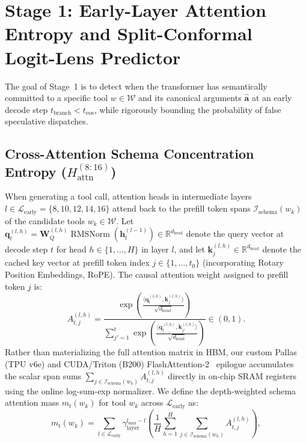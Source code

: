 \documentclass[10pt,conference]{IEEEtran}
\begin{document}
\section{Stage 1: Early-Layer Attention Entropy and Split-Conformal Logit-Lens Predictor}
\label{sec:stage1}

The goal of Stage~1 is to detect when the transformer has semantically committed to a specific tool $w \in \mathcal{W}$ and its canonical arguments $\hat{\mathbf{a}}$ at an early decode step $t_{\text{branch}} < t_{\text{eos}}$, while rigorously bounding the probability of false speculative dispatches.

\subsection{Cross-Attention Schema Concentration Entropy ($H_{\text{attn}}^{(8:16)}$)}
When generating a tool call, attention heads in intermediate layers $l \in \mathcal{L}_{\text{early}} = \{8, 10, 12, 14, 16\}$ attend back to the prefill token spans $\mathcal{I}_{\text{schema}}(w_k)$ of the candidate tools $w_k \in \mathcal{W}$. Let $\mathbf{q}_t^{(l, h)} = \mathbf{W}_Q^{(l, h)} \operatorname{RMSNorm}(\mathbf{h}_t^{(l-1)}) \in \mathbb{R}^{d_{\text{head}}}$ denote the query vector at decode step $t$ for head $h \in \{1, \dots, H\}$ in layer $l$, and let $\mathbf{k}_j^{(l, h)} \in \mathbb{R}^{d_{\text{head}}}$ denote the cached key vector at prefill token index $j \in \{1, \dots, t_0\}$ (incorporating Rotary Position Embeddings, RoPE). The causal attention weight assigned to prefill token $j$ is:
\begin{equation}
A_{t, j}^{(l, h)} = \frac{\exp\!\left(\frac{\langle \mathbf{q}_t^{(l, h)}, \mathbf{k}_j^{(l, h)} \rangle}{\sqrt{d_{\text{head}}}}\right)}{\sum_{j'=1}^{t} \exp\!\left(\frac{\langle \mathbf{q}_t^{(l, h)}, \mathbf{k}_{j'}^{(l, h)} \rangle}{\sqrt{d_{\text{head}}}}\right)} \in (0, 1).
\label{eq:causal_attn_weight}
\end{equation}
Rather than materializing the full attention matrix in HBM, our custom Pallas (TPU v6e) and CUDA/Triton (B200) FlashAttention-2~\cite{dao2024flashattention2} epilogue accumulates the scalar span sums $\sum_{j \in \mathcal{I}_{\text{schema}}(w_k)} A_{t,j}^{(l,h)}$ directly in on-chip SRAM registers using the online log-sum-exp normalizer. We define the depth-weighted schema attention mass $m_t(w_k)$ for tool $w_k$ across $\mathcal{L}_{\text{early}}$ as:
\begin{equation}
m_t(w_k) = \sum_{l \in \mathcal{L}_{\text{early}}} \gamma_{\text{layer}}^{l_{\max} - l} \left( \frac{1}{H} \sum_{h=1}^H \sum_{j \in \mathcal{I}_{\text{schema}}(w_k)} A_{t, j}^{(l, h)} \right),
\label{eq:schema_mass}
\end{equation}
\end{document}
